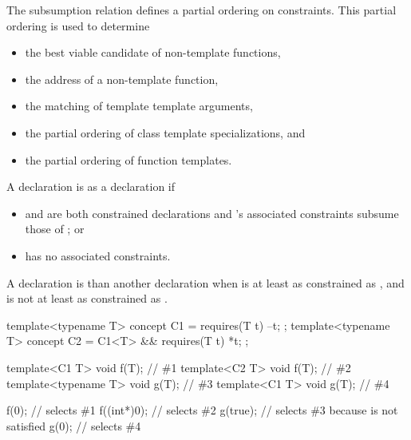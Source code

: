 \pnum
\begin{note}
The subsumption relation defines a partial ordering on constraints.
This partial ordering is used to determine
\begin{itemize}
\item the best viable candidate of non-template functions,
\item the address of a non-template function,
\item the matching of template template arguments,
\item the partial ordering of class template specializations, and
\item the partial ordering of function templates.
\end{itemize}
\end{note}

\pnum
A declaration  is
 as
a declaration  if
\begin{itemize}
\item {} and  are both constrained declarations and
's associated constraints subsume those of ; or

\item {} has no associated constraints.
\end{itemize}

\pnum
A declaration  is 
than another declaration  when  is at least as
constrained as , and  is not at least as
constrained as .
\begin{example}
\begin{codeblock}
template<typename T> concept C1 = requires(T t) { --t; };
template<typename T> concept C2 = C1<T> && requires(T t) { *t; };

template<C1 T> void f(T);       // \#1
template<C2 T> void f(T);       // \#2
template<typename T> void g(T); // \#3
template<C1 T> void g(T);       // \#4

f(0);                           // selects \#1
f((int*)0);                     // selects \#2
g(true);                        // selects \#3 because  is not satisfied
g(0);                           // selects \#4
\end{codeblock}
\end{example}

